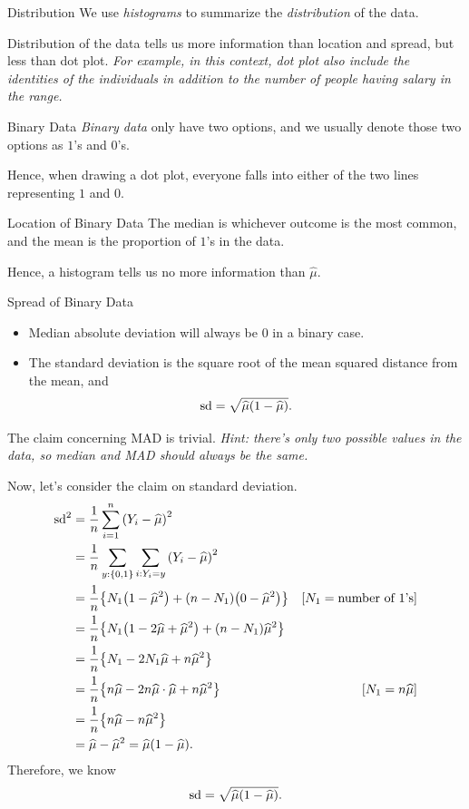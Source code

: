 \begin{df}{Distribution}
	We use \textit{histograms} to summarize the \textit{distribution} of the data. 
\end{df}
\begin{rmk}
	Distribution of the data tells us more information than location and spread, but less than dot plot. \emph{For example, in this context, dot plot also include the identities of the individuals in addition to the number of people having salary in the range. }
\end{rmk}
\begin{df}{Binary Data}
	\textit{Binary data} only have two options, and we usually denote those two options as $1$'s and $0$'s. 	
\end{df}
\begin{cor}{}
	Hence, when drawing a dot plot, everyone falls into either of the two lines representing $1$ and $0$.
\end{cor}
\begin{thm}{Location of Binary Data}
	The median is whichever outcome is the most common, and the mean is the proportion of $1$'s in the data. 
\end{thm}
\begin{rmk}
	Hence, a histogram tells us no more information than $\hat\mu$.	
\end{rmk}
\begin{thm}{Spread of Binary Data}
	\begin{itemize}
		\item Median absolute deviation will always be $0$ in a binary case.
		\item The standard deviation is the square root of the mean squared distance from the mean, and \[\text{sd}=\sqrt{\widehat\mu\qty(1-\widehat\mu)}.\]
	\end{itemize}
\end{thm}
\begin{prf}
	The claim concerning MAD is trivial. \textit{Hint: there's only two possible values in the data, so median and MAD should always be the same.}\par Now, let's consider the claim on standard deviation. \begin{align*}\mathrm{sd}^2&=\dfrac{1}{n}\sum_{i=1}^n\qty(Y_i-\widehat\mu)^2\\&=\dfrac{1}{n}\sum_{y:\qty{0,1}}\sum_{i:Y_i=y}\qty(Y_i-\widehat\mu)^2\\&=\dfrac{1}{n}\qty{N_1\qty(1-\widehat\mu^2)+\qty(n-N_1)\qty(0-\widehat\mu^2)}&[N_1=\text{number of }1\text{'s}]\\&=\dfrac{1}{n}\qty{N_1\qty(1-2\widehat\mu+\widehat\mu^2)+\qty(n-N_1)\widehat\mu^2}\\&=\dfrac{1}{n}\qty{N_1-2N_1\widehat\mu+n\widehat\mu^2}\\&=\dfrac{1}{n}\qty{n\widehat\mu-2n\widehat\mu\cdot\widehat\mu+n\widehat\mu^2}&[N_1=n\widehat\mu]\\&=\dfrac{1}{n}\qty{n\widehat\mu-n\widehat\mu^2}\\&=\widehat\mu-\widehat\mu^2=\widehat\mu\qty(1-\widehat\mu).\end{align*} Therefore, we know \[\mathrm{sd}=\sqrt{\widehat\mu\qty(1-\widehat\mu)}.\]
\end{prf}
